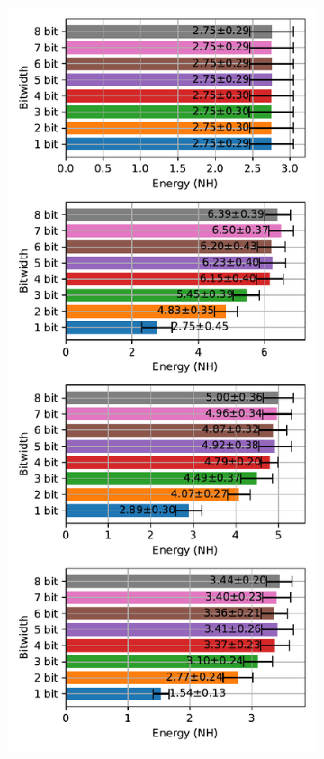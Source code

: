         \begin{figure}[!htpb]
            \centering
            \begin{subfigure}[H]{0.48\textwidth}
                \includegraphics[width=\textwidth]{../standard/FashionMNIST/plots/fashionmnist_test_energy_nh.pdf}

\end{subfigure}
\end{figure}
